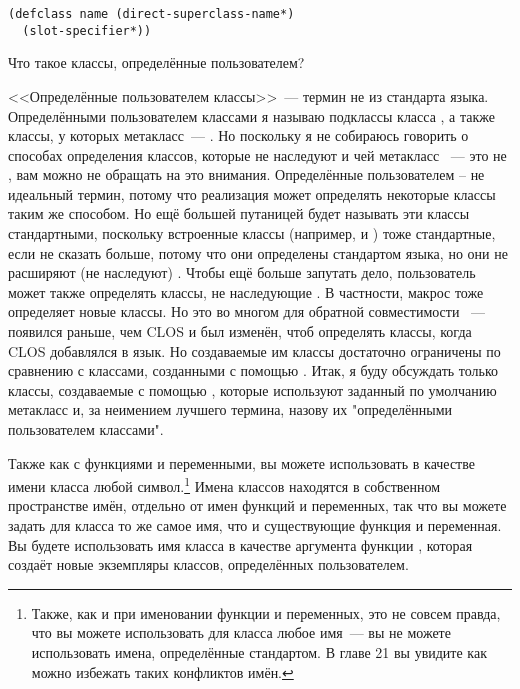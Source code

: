 \begin{lstlisting}
(defclass name (direct-superclass-name*)
  (slot-specifier*))
\end{lstlisting}

Что такое классы, определённые пользователем?

<<Определённые пользователем классы>>~--- термин не из стандарта языка. Определёнными
пользователем классами я называю подклассы класса , а также классы,
у которых метакласс~--- . Но поскольку я не собираюсь говорить о
способах определения классов, которые не наследуют  и чей метакласс
~--- это не , вам можно не обращать на это внимания. Определённые
пользователем -- не идеальный термин, потому что реализация может определять некоторые
классы таким же способом. Но ещё большей путаницей будет называть эти классы стандартными,
поскольку встроенные классы (например,  и ) тоже стандартные,
если не сказать больше, потому что они определены стандартом языка, но они не расширяют
(не наследуют) . Чтобы ещё больше запутать дело, пользователь может
также определять классы, не наследующие . В частности, макрос
 тоже определяет новые классы. Но это во многом для обратной совместимости
~---  появился раньше, чем CLOS и был изменён, чтоб определять классы, когда
CLOS добавлялся в язык. Но создаваемые им классы достаточно ограничены по сравнению с
классами, созданными с помощью . Итак, я буду обсуждать только классы,
создаваемые с помощью , которые используют заданный по умолчанию метакласс
 и, за неимением лучшего термина, назову их "определёнными
пользователем классами".

Также как с функциями и переменными, вы можете использовать в качестве имени класса любой
символ.\footnote{Также, как и при именовании функции и переменных, это не совсем правда,
  что вы можете использовать для класса любое имя~--- вы не можете использовать имена,
  определённые стандартом.  В главе 21 вы увидите как можно избежать таких конфликтов
  имён.}  Имена классов находятся в собственном пространстве имён, отдельно от имен
функций и переменных, так что вы можете задать для класса то же самое имя, что и
существующие функция и переменная.  Вы будете использовать имя класса в качестве аргумента
функции , которая создаёт новые экземпляры классов, определённых
пользователем.


